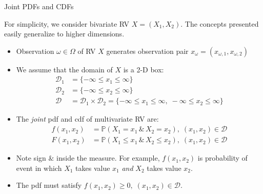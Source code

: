 \documentclass[9pt]{beamer}
\begin{document}
%
\begin{frame}{Joint PDFs and CDFs}

For simplicity, we consider bivariate RV $X=(X_1,X_2)$. The concepts presented easily generalize to higher dimensions.

\begin{itemize}

\item Observation $\omega \in \Omega$ of RV $X$ generates observation pair $x_\omega=(x_{\omega,1},x_{\omega,2})$ 

\item We assume that the domain of $X$ is a 2-D box: 
\begin{align*}
\mathcal{D}_1&=\{-\infty \leq x_1\leq \infty\}\\
\mathcal{D}_2&=\{-\infty \leq x_2\leq \infty\}\\
\mathcal{D}&=\mathcal{D}_1\times \mathcal{D}_2=\{-\infty \leq x_1\leq \infty,\;  -\infty \leq x_2\leq \infty\}
\end{align*}

\item The {\em joint} pdf and cdf of multivariate RV are:
\begin{align*}
f(x_1,x_2)&=\mathbb{P}(X_1=x_1\,\&\, X_2=x_2),\; (x_1,x_2)\in\mathcal{D}\\
F(x_1,x_2)&=\mathbb{P}(X_1\leq x_1\,\&\, X_2\leq x_2),\; (x_1,x_2)\in\mathcal{D}
\end{align*}
\item Note sign $\&$ inside the measure. For example, $f(x_1,x_2)$ is probability of event in which $X_1$ takes value  $x_1$ {\em and} $X_2$ takes value $x_2$.  

\item The pdf must satisfy $f(x_1,x_2)\geq 0,\; (x_1,x_2)\in \mathcal{D}$.

\end{itemize}


\end{frame}
\end{document}
